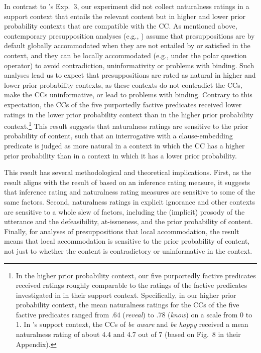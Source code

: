 \documentclass[11pt,fleqn]{article}
\newcommand{\6}{\mbox{$[\hspace*{-.6mm}[$}}
\newcommand{\9}{\mbox{$]\hspace*{-.6mm}]$}}
\newcommand{\citepos}[1]{\citeauthor{#1}'s \citeyear{#1}}
\begin{document}
In contrast to \citepos{mandelkern-etal2020} Exp.~3, our experiment did not collect naturalness ratings in a support context that entails the relevant content but in higher and lower prior probability contexts that are compatible with the CC. As mentioned above, contemporary presupposition analyses (e.g., \citealt{heim83,vds92}) assume that presuppositions are by default globally accommodated when they are not entailed by or satisfied in the context, and they can be locally accommodated (e.g., under the polar question operator) to avoid contradiction, uninformativity or problems with binding. Such analyses lead us to expect that presuppositions are rated as natural in higher and lower prior probability contexts, as these contexts do not contradict the CCs, make the CCs uninformative, or lead to problems with binding. Contrary to this expectation, the CCs of the five purportedly factive predicates received lower ratings in the lower prior probability context than in the higher prior probability context.\footnote{In the higher prior probability context, our five purportedly factive predicates received ratings roughly comparable to the ratings of the factive predicates investigated in \citealt{mandelkern-etal2020} in their support context. Specifically, in our higher prior probability context, the mean naturalness ratings for the CCs of the five factive predicates ranged from .64 ({\em reveal}) to .78 ({\em know}) on a scale from 0 to 1. In \citepos{mandelkern-etal2020} support context, the CCs of {\em be aware} and {\em be happy} received a mean naturalness rating of about 4.4 and 4.7 out of 7 (based on Fig.~8 in their Appendix).} This result suggests that naturalness ratings are sensitive to the prior probability of content, such that an interrogative with a clause-embedding predicate is judged as more natural in a context in which the CC has a higher prior probability than in a context in which it has a lower prior probability. 

This result has several methodological and theoretical implications. First, as the result aligns with the result of \citealt{degen-tonhauser-openmind} based on an inference rating measure, it suggests that inference rating and naturalness rating measures are sensitive to some of the same factors. Second, naturalness ratings in explicit ignorance and other contexts are sensitive to a whole slew of factors, including the (implicit) prosody of the utterance and the defeasibility, at-issueness, and the prior probability of content. Finally, for analyses of presuppositions that local accommodation, the result means that local accommodation is sensitive to the prior probability of content, not just to whether the content is contradictory or uninformative in the context. 
\end{document}
